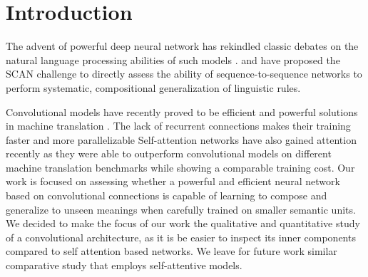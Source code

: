 \section{Introduction}
\label{sec:intro}

The advent of powerful deep neural network has rekindled classic
debates on the natural language processing abilities of such models
\cite[e.g.,][]{Kirov:Cotterell:2018,Linzen:etal:2018,McCoy:etal:2018,Pater:2018}. \citet{Lake:Baroni:2017}
and \citet{Loula:etal:2018} have proposed the SCAN challenge to
directly assess the ability of sequence-to-sequence networks to
perform systematic, compositional generalization of linguistic rules.



Convolutional models have recently proved to be efficient and powerful solutions in machine translation 
\cite{kalchbrenner:etal:2016, gehring:etal:2016, gehring:etal:2017}.
The lack of recurrent connections makes their training faster and more parallelizable 
Self-attention networks have also gained attention recently as they were able to outperform convolutional models on different
machine translation benchmarks \cite{vaswani:etal:2017, chen:etal:2018} while showing a comparable training cost.
Our work is focused on assessing whether a powerful and efficient neural network based on convolutional connections
is capable of learning to compose and generalize to unseen meanings when carefully trained on smaller semantic units.
We decided to make the focus of our work the qualitative and quantitative study of a convolutional architecture, as
it is be easier to inspect its inner components compared to self attention based networks.
We leave for future work similar comparative study that employs self-attentive models.



